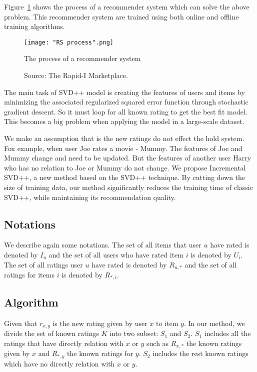 \documentclass[oneside,13pt]{extreport}
\begin{document}
Figure~\ref{fig:RS_process} shows the process of a recommender system which can solve the above problem. This recommender system are trained using both online and offline training algorithms.
\clearpage
\begin{figure}[h!]
    \centering
    \texttt{[image: "RS process".png]} 
    \caption{The process of a recommender system}
    \!\!\!\!
    \caption*{Source: The Rapid-I Marketplace.}
    \label{fig:RS_process}
\end{figure}


The main task of SVD++ model is creating the features of users and items by minimizing the associated regularized squared error function through stochastic gradient descent. So it must loop for all known rating to get the best fit model. This becomes a big problem when applying the model in a large-scale dataset.
 
We make an assumption that is the new ratings do not effect the hold system. Fox example, when user Joe rates  a movie - Mummy. The features of Joe and Mummy change and need to be updated. But the features of another user Harry who has no relation to Joe or Mummy do not change. We propose Incremental SVD++, a new method based on the SVD++ technique. By cutting down the size of training data, our method significantly reduces the training time of classic SVD++, while maintaining its recommendation quality. 

\subsection{Notations}
We describe again some notations.
The set of all items that user $u$ have rated is denoted by $I_u$ and the set of all users who have rated item $i$ is denoted by $U_i$.
The set of all ratings user $u$ have rated is denoted by $R_{u,*}$ and the set of all ratings for items $i$ is denoted by $R_{*,i}$.
\subsection{Algorithm}

Given that $r_{x,y}$ is the new rating given by user $x$ to item $y$.
In our method, we divide the set of known ratings $K$ into two subset: $S_1$ and $S_2$. $S_1$ includes all the ratings that have directly relation with $x$ or $y$ such as $R_{x,*}$ the known ratings given by $x$  and $R_{*,y}$ the known ratings for $y$. $S_2$ includes the rest known ratings which have no directly relation with $x$ or $y$.
\end{document}

